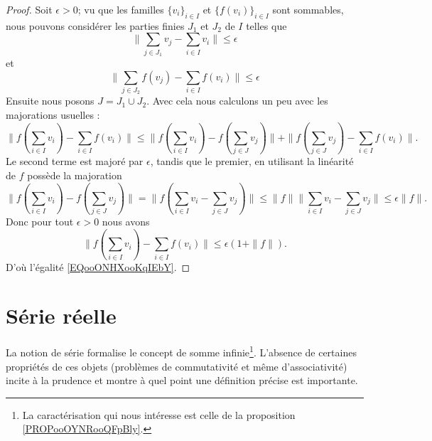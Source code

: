 \begin{proof}
	Soit \( \epsilon>0\); vu que les familles \( \{ v_i \}_{i\in I}\) et \( \{ f(v_i) \}_{i\in I}\) sont sommables, nous pouvons considérer les parties finies \( J_1\) et \( J_2\) de \( I\) telles que
	\begin{equation}
		\big\| \sum_{j\in J_1}v_j-\sum_{i\in I}v_i \big\|\leq \epsilon
	\end{equation}
	et
	\begin{equation}
		\big\| \sum_{j\in J_2}f(v_j)-\sum_{i\in I}f(v_i) \big\|\leq \epsilon
	\end{equation}
	Ensuite nous posons \( J=J_1\cup J_2\). Avec cela nous calculons un peu avec les majorations usuelles :
	\begin{equation}
		\| f(\sum_{i\in I}v_i) -\sum_{i\in I}f(v_i) \|\leq \| f(\sum_{i\in I}v_i)- f(\sum_{j\in J}v_j) \|+  \| f(\sum_{j\in J}v_j)-\sum_{i\in I}f(v_i) \|.
	\end{equation}
	Le second terme est majoré par \( \epsilon\), tandis que le premier, en utilisant la linéarité de \( f\) possède la majoration
	\begin{equation}
		\| f(\sum_{i\in I}v_i)- f(\sum_{j\in J}v_j) \|=\| f(\sum_{i\in I}v_i-\sum_{j\in J}v_j) \|\leq \| f \| \| \sum_{i\in I}v_i- \sum_{j\in J}v_j\|\leq \epsilon\| f \|.
	\end{equation}
	Donc pour tout \( \epsilon>0\) nous avons
	\begin{equation}
		\| f(\sum_{i\in I}v_i) -\sum_{i\in I}f(v_i) \|\leq \epsilon(1+\| f \|).
	\end{equation}
	D'où l'égalité \eqref{EQooONHXooKqIEbY}.
\end{proof}


\section{Série réelle}
\label{secseries}

La notion de série formalise le concept de somme infinie\footnote{La caractérisation qui nous intéresse est celle de la proposition \ref{PROPooOYNRooQFpBly}.}. L'absence de certaines propriétés de ces objets (problèmes de commutativité et même d'associativité) incite à la prudence et montre à quel point une définition précise est importante.


